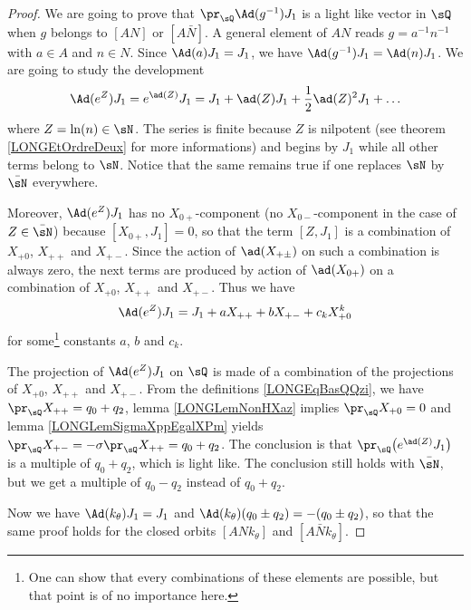 \begin{proof}
    We are going to prove that $\pr_{\sQ}\Ad(g^{-1})J_1$ is a light like vector in $\sQ$ when $g$ belongs to $[AN]$ or $[A\bar N]$. A general element of $AN$ reads $g=a^{-1}n^{-1}$ with $a\in A$ and $n\in N$. Since $\Ad(a)J_1=J_1$, we have $\Ad(g^{-1})J_1=\Ad(n)J_1$. We are going to study the development
    \begin{equation}
        \Ad( e^{Z})J_1= e^{\ad(Z)}J_1=J_1+\ad(Z)J_1+\frac{ 1 }{2}\ad(Z)^2J_1+\ldots
    \end{equation}
    where $Z=\ln(n)\in\sN$. The series is finite because $Z$ is nilpotent (see theorem \ref{LONGEtOrdreDeux} for more informations) and begins by $J_1$ while all other terms belong to $\sN$. Notice that the same remains true if one replaces $\sN$ by $\bar \sN$ everywhere. 
    
    Moreover, $\Ad( e^{Z})J_1$ has no $X_{0+}$-component (no $X_{0-}$-component in the case of $Z\in\bar\sN$) because $[X_{0+},J_1]=0$, so that the term $[Z,J_1]$ is a combination of $X_{+0}$, $X_{++}$ and $X_{+-}$.  Since the action of $\ad(X_{+\pm})$ on such a combination is always zero, the next terms are produced by action of $\ad(X_{0+})$ on a combination of $X_{+0}$, $X_{++}$ and $X_{+-}$. Thus we have
\begin{equation}        \label{LONGEqAdanJUnabck}
    \Ad( e^{Z})J_1=J_1+aX_{++}+bX_{+-}+c_kX_{+0}^k
\end{equation}
for some\footnote{One can show that every combinations of these elements are possible, but that point is of no importance here.} constants $a$, $b$ and $c_k$.

The projection of $\Ad( e^{Z})J_1$ on $\sQ$ is made of a combination of the projections of $X_{+0}$, $X_{++}$ and $X_{+-}$. From the definitions \eqref{LONGEqBasQQzi}, we have $\pr_{\sQ}X_{++}=q_0+q_2$, lemma \ref{LONGLemNonHXaz} implies $\pr_{\sQ}X_{+0}=0$ and lemma \ref{LONGLemSigmaXppEgalXPm} yields $\pr_{\sQ}X_{+-}=-\sigma\pr_{\sQ}X_{++}=q_0+q_2$. The conclusion is that $\pr_{\sQ}\big( e^{\ad(Z)}J_1\big)$ is a multiple of $q_0+q_2$, which is light like. The conclusion still holds with $\bar\sN$, but we get a multiple of $q_0-q_2$ instead of $q_0+q_2$.

    Now we have $\Ad(k_{\theta})J_1=J_1$ and $\Ad(k_{\theta})(q_0\pm q_2)=-(q_0\pm q_2)$, so that the same proof holds for the closed orbits $[ANk_{\theta}]$ and $[A\bar N k_{\theta}]$.
\end{proof}

